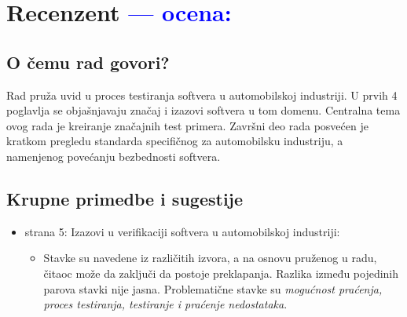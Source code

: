 \documentclass[a4paper]{report}
\newcommand{\odgovor}[1]{\textcolor{blue}{#1}}
\begin{document}
\chapter{Recenzent \odgovor{--- ocena:} }


\section{O čemu rad govori?}

Rad pruža uvid u proces testiranja softvera u automobilskoj industriji. U prvih 4 poglavlja se objašnjavaju značaj i izazovi softvera u tom domenu. Centralna tema ovog rada je kreiranje značajnih test primera. Završni deo rada posvećen je kratkom pregledu standarda specifičnog za automobilsku industriju, a namenjenog povećanju bezbednosti softvera.

\section{Krupne primedbe i sugestije}

\begin{itemize}
\item strana 5: Izazovi u verifikaciji softvera u automobilskoj industriji:
  \begin{itemize}
  \item Stavke su navedene iz različitih izvora, a na osnovu pruženog u radu, čitaoc može da zaključi da postoje preklapanja. Razlika između pojedinih parova stavki nije jasna. Problematične stavke su {\em{mogućnost praćenja, proces testiranja, testiranje i praćenje nedostataka}}.
  \end{itemize}
\end{itemize}
\end{document}
